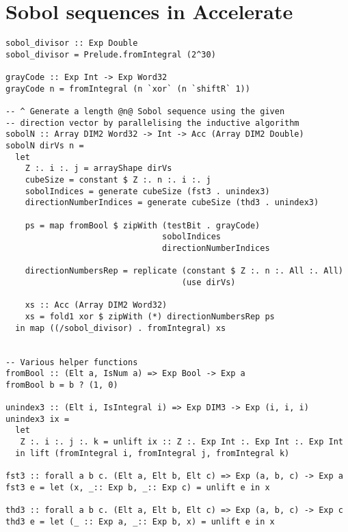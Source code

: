 \chapter{Sobol sequences in Accelerate}

\begin{lstlisting}sobol_divisor :: Exp Double
sobol_divisor = Prelude.fromIntegral (2^30)

grayCode :: Exp Int -> Exp Word32
grayCode n = fromIntegral (n `xor` (n `shiftR` 1))

-- ^ Generate a length @n@ Sobol sequence using the given
-- direction vector by parallelising the inductive algorithm
sobolN :: Array DIM2 Word32 -> Int -> Acc (Array DIM2 Double)
sobolN dirVs n =
  let
    Z :. i :. j = arrayShape dirVs
    cubeSize = constant $ Z :. n :. i :. j
    sobolIndices = generate cubeSize (fst3 . unindex3)
    directionNumberIndices = generate cubeSize (thd3 . unindex3)

    ps = map fromBool $ zipWith (testBit . grayCode)
                                sobolIndices
                                directionNumberIndices

    directionNumbersRep = replicate (constant $ Z :. n :. All :. All) 
                                    (use dirVs)

    xs :: Acc (Array DIM2 Word32)
    xs = fold1 xor $ zipWith (*) directionNumbersRep ps
  in map ((/sobol_divisor) . fromIntegral) xs


-- Various helper functions
fromBool :: (Elt a, IsNum a) => Exp Bool -> Exp a
fromBool b = b ? (1, 0)

unindex3 :: (Elt i, IsIntegral i) => Exp DIM3 -> Exp (i, i, i)
unindex3 ix =
  let
   Z :. i :. j :. k = unlift ix :: Z :. Exp Int :. Exp Int :. Exp Int
  in lift (fromIntegral i, fromIntegral j, fromIntegral k)

fst3 :: forall a b c. (Elt a, Elt b, Elt c) => Exp (a, b, c) -> Exp a
fst3 e = let (x, _:: Exp b, _:: Exp c) = unlift e in x

thd3 :: forall a b c. (Elt a, Elt b, Elt c) => Exp (a, b, c) -> Exp c
thd3 e = let (_ :: Exp a, _:: Exp b, x) = unlift e in x
\end{lstlisting}